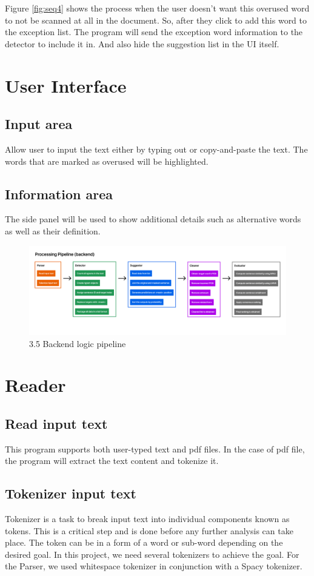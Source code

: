 \documentclass[12pt,oneside,openright,a4paper]{cpe-english-project}
\begin{document}
Figure \ref{fig:seq4} shows the process when the user doesn’t want this overused word to not be scanned at all in the document. So, after they click to add this word to the exception list. The program will send the exception word information to the detector to include it in. And also hide the suggestion list in the UI itself.

\section{User Interface}
\subsection{Input area}
Allow user to input the text either by typing out or copy-and-paste the text.
The words that are marked as overused will be highlighted.
\subsection{Information area}
The side panel will be used to show additional details such as alternative words as well as their definition. 

\begin{figure}[!h]\centering
\includegraphics[width=15cm]{./img/chp3/processsingPipe.png}
\caption{3.5 Backend logic pipeline}\label{fig:corePP}
\end{figure}
\section{Reader}
\subsection{Read input text}
This program supports both user-typed text and pdf files. In the case of pdf file, the program will extract the text content and tokenize it.
\subsection{Tokenizer input text}
Tokenizer is a task to break input text into individual components known as tokens. This is a critical step and is done before any further analysis can take place. The token can be in a form of a word or sub-word depending on the desired goal. In this project, we need several tokenizers to achieve the goal. For the Parser, we used whitespace tokenizer in conjunction with a Spacy tokenizer. 
\end{document}
